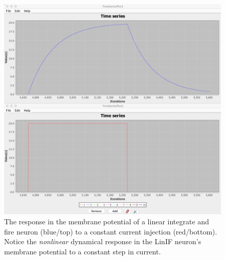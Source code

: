 \begin{figure}[h]
\centering
\includegraphics[width=\textwidth]{./images/LinIF_VoltTrace.png}
\caption[Simbrain screenshot by Zo\"e Tosi]{The response in the membrane potential of a linear integrate and fire neuron (blue/top) to a constant current injection (red/bottom). Notice the \emph{nonlinear} dynamical response in the LinIF neuron's membrane potential to a constant step in current. }
\label{LinIF_Traces}
\end{figure}


